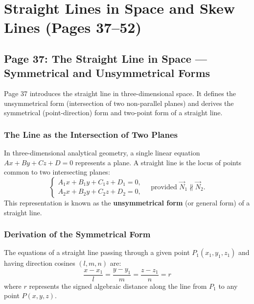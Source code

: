 \chapter{Straight Lines in Space and Skew Lines (Pages 37--52)}
\label{ch:straight_line_skew}

\section{Page 37: The Straight Line in Space --- Symmetrical and Unsymmetrical Forms}
\label{sec:page37}

\begin{conceptbox}
Page 37 introduces the straight line in three-dimensional space. It defines the unsymmetrical form (intersection of two non-parallel planes) and derives the symmetrical (point-direction) form and two-point form of a straight line.
\end{conceptbox}

\subsection{The Line as the Intersection of Two Planes}
In three-dimensional analytical geometry, a single linear equation $Ax + By + Cz + D = 0$ represents a plane. A straight line is the locus of points common to two intersecting planes:
\begin{equation}
    \begin{cases}
    A_1 x + B_1 y + C_1 z + D_1 = 0, \\
    A_2 x + B_2 y + C_2 z + D_2 = 0,
    \end{cases} \quad \text{provided } \vec{N}_1 \nparallel \vec{N}_2.
\end{equation}
This representation is known as the \textbf{unsymmetrical form} (or general form) of a straight line.

\subsection{Derivation of the Symmetrical Form}
\begin{theorembox}
The equations of a straight line passing through a given point $P_1(x_1, y_1, z_1)$ and having direction cosines $(l, m, n)$ are:
\begin{equation}
    \boxed{\frac{x - x_1}{l} = \frac{y - y_1}{m} = \frac{z - z_1}{n} = r}
\end{equation}
where $r$ represents the signed algebraic distance along the line from $P_1$ to any point $P(x, y, z)$.
\end{theorembox}

